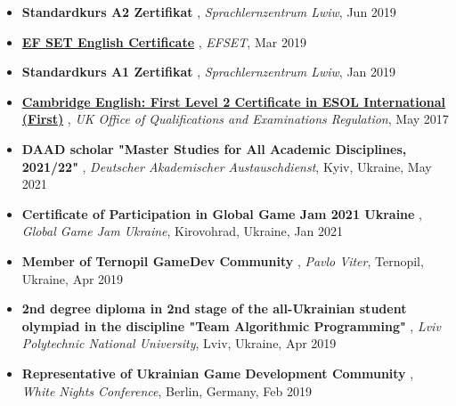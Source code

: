 \documentclass[letterpaper,10pt]{article}
\newcommand{\titleItem}[1]{
  \textbf{#1}
}
\begin{document}
\begin{itemize}[leftmargin=0.15in, label={}]
    \item
			\titleItem{Standardkurs A2 Zertifikat}, \emph{Sprachlernzentrum Lwiw}, Jun 2019
			\vspace{-9pt}
		
    \item
			\titleItem{\href{https://cert.efset.org/ujc8RC}{{EF SET English Certificate}}}, \emph{EFSET}, Mar 2019
			\vspace{-9pt}
		
    \item
			\titleItem{Standardkurs A1 Zertifikat}, \emph{Sprachlernzentrum Lwiw}, Jan 2019
			\vspace{-9pt}
		
    \item
			\titleItem{\href{https://drive.google.com/file/d/1qcIYSFNIVZ2rZL4G9o46xJTBmrIXxtuM/view?usp=sharing}{{Cambridge English: First Level 2 Certificate in ESOL International (First)}}}, \emph{UK Office of Qualifications and Examinations Regulation}, May 2017
			\vspace{-9pt}
		
\par\hrulefill

    \item
			\titleItem{DAAD scholar "Master Studies for All Academic Disciplines, 2021/22"}, \emph{Deutscher Akademischer Austauschdienst}, {Kyiv, Ukraine}, May 2021
			\vspace{-9pt}
		
    \item
			\titleItem{Certificate of Participation in Global Game Jam 2021 Ukraine}, \emph{Global Game Jam Ukraine}, {Kirovohrad, Ukraine}, Jan 2021
			\vspace{-9pt}
		
    \item
			\titleItem{Member of Ternopil GameDev Community}, \emph{Pavlo Viter}, {Ternopil, Ukraine}, Apr 2019
			\vspace{-9pt}
		
    \item
			\titleItem{2nd degree diploma in 2nd stage of the all-Ukrainian student olympiad in the discipline "Team Algorithmic Programming"}, \emph{Lviv Polytechnic National University}, {Lviv, Ukraine}, Apr 2019
			\vspace{-9pt}
		
    \item
			\titleItem{Representative of Ukrainian Game Development Community}, \emph{White Nights Conference}, {Berlin, Germany}, Feb 2019
			\vspace{-9pt}
		

\end{itemize}
\end{document}
